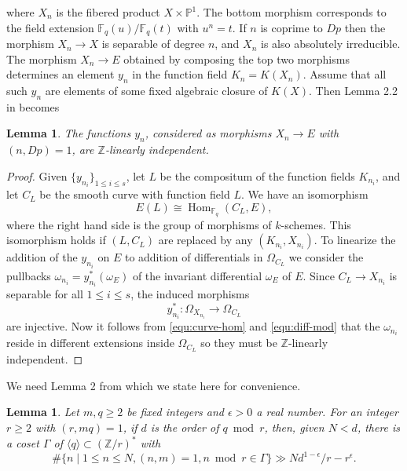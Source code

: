 \documentclass[12pt]{article}
\theoremstyle{plain}
\newtheorem{lemma}[theorem]{Lemma}
\theoremstyle{definition}
\newcommand{\ang}[1]{\langle#1\rangle}
\DeclareMathOperator{\Hom}{Hom}
\def\Z{\ensuremath{\mathbb{Z}}}
\def\F{\ensuremath{\mathbb{F}}}
\def\P{\ensuremath{\mathbb{P}}}
\begin{document}
where $X_n$ is the fibered product $X \times \P^1$. The bottom morphism corresponds to the field 
extension $\F_q(u)/\F_q(t)$ with $u^n = t$. If $n$ is coprime to $Dp$ then the morphism $X_n 
\rightarrow X$ is separable of degree $n$, and $X_n$ is also absolutely irreducible. The morphism 
$X_n \rightarrow E$ obtained by composing the top two morphisms determines an element $y_n$ in the 
function field $K_n = K(X_n)$. Assume that all such $y_n$ are elements of some fixed algebraic 
closure of $K(X)$. Then Lemma 2.2 in \cite{voloch2010} becomes
\begin{lemma}
	\label{lem:linear-ind}
	The functions $y_n$, considered as morphisms $X_n \rightarrow E$ with $(n, Dp) = 1$, are 
	$\Z$-linearly independent.
\end{lemma}
\begin{proof}
	Given $\{y_{n_i}\}_{1 \le i \le s}$, let $L$ be the compositum of the function fields $K_{n_i}$,
	and let $C_L$ be the smooth curve with function field $L$. We have an isomorphism 
	\begin{equation}
	\label{equ:curve-hom}
		E(L) \cong \Hom_{\F_q}(C_L, E),
	\end{equation}
	where the right hand side is the group of morphisms of $k$-schemes. This isomorphism holds if 
	$(L, C_L)$ are replaced by any $(K_{n_i}, X_{n_i})$. To linearize the addition of the $y_{n_i}$ 
	on $E$ to addition of differentials in $\Omega_{C_L}$ we consider the pullbacks $\omega_{n_i} = 
	y_{n_i}^*(\omega_E)$ of the invariant differential $\omega_E$ of $E$. Since $C_L \rightarrow 
	X_{n_i}$ is separable for all $1 \le i \le s$, the induced morphisms
	\begin{equation}
	\label{equ:diff-mod}
	y_{n_i}^*: \Omega_{X_{n_i}} \longrightarrow \Omega_{C_L}
	\end{equation}
	are injective. Now it follows from \eqref{equ:curve-hom} and \eqref{equ:diff-mod} that the 
	$\omega_{n_i}$ reside in different extensions inside $\Omega_{C_L}$ so they must be 
	$\Z$-linearly independent.
\end{proof}
We need Lemma 2 from \cite{voloch2007} which we state here for convenience.
\begin{lemma}
	\label{lem:coset}
	Let $m, q \ge 2$ be fixed integers and $\epsilon > 0$ a real number. For an integer $r \ge 2$ 
	with $(r, mq) = 1$, if $d$ is the order of $q \bmod r$, then, given $N < d$, there is a coset 
	$\Gamma$ of $\ang{q} \subset (\Z / r)^*$ with
	\[ \# \{ n \mid 1 \le n \le N, (n, m) = 1, n \bmod r \in \Gamma \} \gg Nd^{1 - \epsilon} / r - 
	r^\epsilon. \]
\end{lemma}
\end{document}
